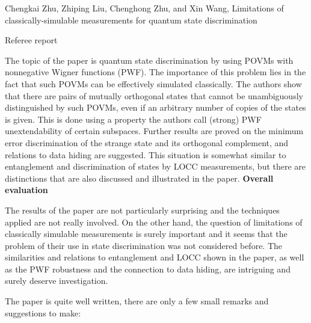 \documentclass[12pt]{article}
\begin{document}
\begin{center}
{\large  Chengkai Zhu, Zhiping Liu, Chenghong Zhu, and Xin Wang, Limitations of classically-simulable measurements for quantum state discrimination}

\end{center}
\medskip

\centerline{Referee report}

\bigskip

The topic of the paper is quantum state discrimination by using POVMs with nonnegative
Wigner functions (PWF). The importance of this problem  lies in the fact that such POVMs
 can be effectively simulated classically. The authors show that there are pairs of
 mutually orthogonal states  that cannot
 be unambiguously distinguished by such POVMs, even if  an  arbitrary number of copies of
 the states is given. This is done using a property the authors call (strong) PWF
 unextendability of certain subspaces. Further results are proved on the minimum error
 discrimination of the strange state and its orthogonal complement, and relations to data
 hiding are suggested. This situation is somewhat similar to entanglement and
 discrimination of states by LOCC measurements, but there are distinctions that are
 also discussed and illustrated  in the paper. 
\textbf{Overall evaluation}


\medskip

The results of the paper are not particularly surprising and the techniques applied are
not really involved. On the other hand, the question of limitations of classically
simulable measurements is surely important and  it seems that the problem of their use in
state discrimination was not considered before. The similarities and relations to
entanglement and LOCC shown in the paper, as well as the PWF robustness and the connection
to data hiding, are intriguing and surely deserve investigation. 



\medskip
 
The paper is quite well written, there are only a few small remarks and suggestions to make:
\end{document}
